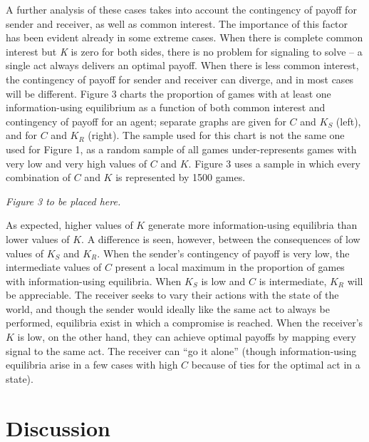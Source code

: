 \documentclass[10pt]{article}
\begin{document}
A further analysis of these cases takes into account the contingency of
payoff for sender and receiver, as well as common interest. The
importance of this factor has been evident already in some extreme
cases. When there is complete common interest but \emph{K} is zero for
both sides, there is no problem for signaling to solve -- a single act
always delivers an optimal payoff. When there is less common interest,
the contingency of payoff for sender and receiver can diverge, and in
most cases will be different. Figure 3 charts the proportion of games
with at least one information-using equilibrium as a function of both
common interest and contingency of payoff for an agent; separate graphs
are given for $C$ and $K_S$ (left), and for $C$ and $K_R$
(right). The sample used for this chart is not the same one used for
Figure 1, as a random sample of all games under-represents games with
very low and very high values of $C$ and $K$. Figure 3 uses a sample
in which every combination of $C$ and $K$ is represented by
1500 games.

\emph{Figure 3 to be placed here.}

As expected, higher values of $K$ generate more information-using
equilibria than lower values of $K$. A difference is seen, however,
between the consequences of low values of $K_S$ and $K_R$. When the
sender's contingency of payoff is very low, the intermediate values of
$C$ present a local maximum in the proportion of games with
information-using equilibria. When $K_S$ is low and $C$ is
intermediate, $K_R$ will be appreciable. The receiver seeks to vary
their actions with the state of the world, and though the sender would
ideally like the same act to always be performed, equilibria exist in
which a compromise is reached. When the receiver's $K$ is low, on
the other hand, they can achieve optimal payoffs by mapping every signal
to the same act. The receiver can ``go it alone'' (though
information-using equilibria arise in a few cases with high $C$ 
because of ties for the optimal act in a state).

\section*{Discussion}
\end{document}
